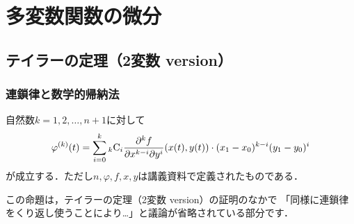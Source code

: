 \documentclass[./index]{subfiles}
\begin{document}
\setcounter{section}{1}
\section{多変数関数の微分}
\setcounter{subsection}{7}
\subsection{テイラーの定理（2変数 version）}

\subsubsection{連鎖律と数学的帰納法}
\begin{screen}
    \begin{proposition}
        自然数$k=1,2,\dots,n+1$に対して
        \begin{equation}
            \label{proposition:1}
            \varphi^{(k)}(t)
            =
            \sum_{i=0}^{k}
                {}_{k} \mathrm{C}_{i}
                \frac{\partial^k f}{\partial x^{k-i} \partial y^{i}} (x(t), y(t))
                \cdot
                (x_1 - x_0)^{k-i}
                (y_1 - y_0)^{i}
        \end{equation}
        が成立する．ただし$n, \varphi, f, x, y$は講義資料で定義されたものである．
    \end{proposition}
\end{screen}

この命題は，テイラーの定理（2変数 version）の証明のなかで
「同様に連鎖律をくり返し使うことにより…」と議論が省略されている部分です．
\end{document}
